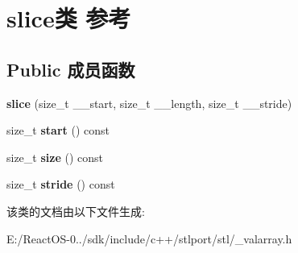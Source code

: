 \hypertarget{classslice}{}\section{slice类 参考}
\label{classslice}
\subsection*{Public 成员函数}
\begin{DoxyCompactItemize}
\item 
\mbox{\label{classslice_a3b2b17b5105e98761a16b418cf620dcc}} 
{\bfseries slice} (size\+\_\+t \+\_\+\+\_\+start, size\+\_\+t \+\_\+\+\_\+length, size\+\_\+t \+\_\+\+\_\+stride)
\item 
\mbox{\label{classslice_a84d25ec1931bbd404cca74342a47063e}} 
size\+\_\+t {\bfseries start} () const
\item 
\mbox{\label{classslice_a11d4ff5bdb8ef823102e71701d7007b6}} 
size\+\_\+t {\bfseries size} () const
\item 
\mbox{\label{classslice_a97667109f1ccf89c29c86fc3c0bf8387}} 
size\+\_\+t {\bfseries stride} () const
\end{DoxyCompactItemize}


该类的文档由以下文件生成\+:\begin{DoxyCompactItemize}
\item 
E\+:/\+React\+O\+S-\/0../sdk/include/c++/stlport/stl/\+\_\+valarray.\+h\end{DoxyCompactItemize}
